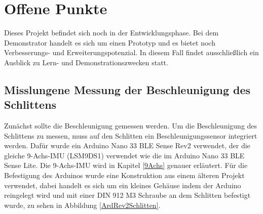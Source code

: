 %
%
%

\chapter{Offene Punkte}

Dieses Projekt befindet sich noch in der Entwicklungsphase. Bei dem Demonstrator handelt es sich um einen Prototyp und es bietet noch Verbesserungs- und Erweiterungspotenzial. In diesem Fall findet ausschließlich ein Ausblick zu Lern- und Demonstrationszwecken statt. 

\section{Misslungene Messung der Beschleunigung des Schlittens}

Zunächst sollte die Beschleunigung gemessen werden. Um die Beschleunigung des Schlittens zu messen, muss auf den Schlitten ein Beschleunigungssensor integriert werden. Dafür wurde ein Arduino Nano 33 BLE Sense Rev2 verwendet, der die gleiche 9-Achs-IMU (LSM9DS1) verwendet wie die im Arduino Nano 33 BLE Sense Lite. Die 9-Achs-IMU wird in Kapitel \ref{9Achs} genauer erläutert. Für die Befestigung des Arduinos wurde eine Konstruktion aus einem älteren Projekt verwendet, dabei handelt es sich um ein kleines Gehäuse indem der Arduino reingelegt wird und mit einer DIN 912 M3 Schraube an dem Schlitten befestigt wurde, zu sehen in Abbildung \ref{ArdRev2Schlitten}.

